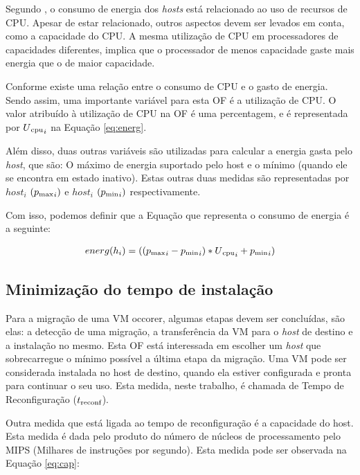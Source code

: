Segundo \cite{beloglazov}, o consumo de energia dos \textit{hosts} está relacionado
ao uso de recursos de CPU. Apesar de estar relacionado, outros aspectos devem ser levados
em conta, como a capacidade do CPU. A mesma utilização de CPU em processadores de capacidades
diferentes, implica que o processador de menos capacidade gaste mais energia que o de maior capacidade.

Conforme \cite{beloglazov} existe uma relação entre o consumo de CPU e o gasto de energia. Sendo assim,
uma importante variável para esta OF é a utilização de CPU. O valor atribuído à utilização de CPU na OF é uma 
percentagem, e é representada por $ U\textsubscript{cpu}_i $ na Equação \ref{eq:energ}. 

Além disso, duas outras variáveis são utilizadas para calcular a energia gasta pelo \textit{host}, que são:
O máximo de energia suportado pelo host e o mínimo (quando ele se encontra em estado inativo). Estas outras duas
medidas são representadas por $ host_i $ $ (p\textsubscript{max}_i) $ e $ host_i $ $ (p\textsubscript{min}_i) $
respectivamente.

Com isso, podemos definir que a Equação que representa o consumo de energia é a seguinte:

\begin{equation}
energ(h_i ) =  ((p\textsubscript{max}_i - p\textsubscript{min}_i) * U\textsubscript{cpu}_i + p\textsubscript{min}_i) 
\label{eq:energ}
\end{equation}

\subsection{Minimização do tempo de instalação}

Para a migração de uma VM occorer, algumas etapas devem ser concluídas, são elas: 
a detecção de uma migração, a transferência da VM para o \textit{host} de destino 
e a instalação no mesmo. Esta OF está interessada em escolher um \textit{host} que 
sobrecarregue o mínimo possível a última etapa da migração. Uma VM pode ser considerada
instalada no host de destino, quando ela estiver configurada e pronta para continuar o seu
uso. Esta medida, neste trabalho, é chamada de Tempo de Reconfiguração ($ t\textsubscript{reconf} $).

Outra medida que está ligada ao tempo de reconfiguração é a capacidade do host. Esta 
medida é dada pelo produto do número de núcleos de processamento pelo MIPS (Milhares de
instruções por segundo). Esta medida pode ser observada na Equação \ref{eq:cap}:

